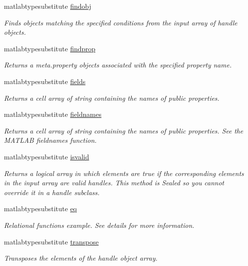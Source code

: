 \begin{DoxyCompactItemize}
matlabtypesubstitute \hyperlink{classhandle_a000398ac90dd973b4618c739e6fd64a9}{findobj}
\begin{DoxyCompactList}\small\item\em Finds objects matching the specified conditions from the input array of handle objects. \end{DoxyCompactList}\item 
matlabtypesubstitute \hyperlink{classhandle_ab4b410e2df940296c9d2563898c951fe}{findprop}
\begin{DoxyCompactList}\small\item\em Returns a meta.\+property objects associated with the specified property name. \end{DoxyCompactList}\item 
matlabtypesubstitute \hyperlink{classhandle_ad9c0557345e68bd933889c28b2a9484b}{fields}
\begin{DoxyCompactList}\small\item\em Returns a cell array of string containing the names of public properties. \end{DoxyCompactList}\item 
matlabtypesubstitute \hyperlink{classhandle_a7086577f3953d4bd9ce17b07c4f6e141}{fieldnames}
\begin{DoxyCompactList}\small\item\em Returns a cell array of string containing the names of public properties. See the M\+A\+T\+L\+AB fieldnames function. \end{DoxyCompactList}\item 
matlabtypesubstitute \hyperlink{classhandle_a72617e83dc9643b61ed8af63e5058ccf}{isvalid}
\begin{DoxyCompactList}\small\item\em Returns a logical array in which elements are true if the corresponding elements in the input array are valid handles. This method is Sealed so you cannot override it in a handle subclass. \end{DoxyCompactList}\item 
matlabtypesubstitute \hyperlink{classhandle_a2fb018cd603a5ced1783bfb20c6cce86}{eq}
\begin{DoxyCompactList}\small\item\em Relational functions example. See details for more information. \end{DoxyCompactList}\item 
matlabtypesubstitute \hyperlink{classhandle_acd9b55f206750374c4dfca508cfff084}{transpose}
\begin{DoxyCompactList}\small\item\em Transposes the elements of the handle object array. \end{DoxyCompactList}\item 

\end{DoxyCompactItemize}
